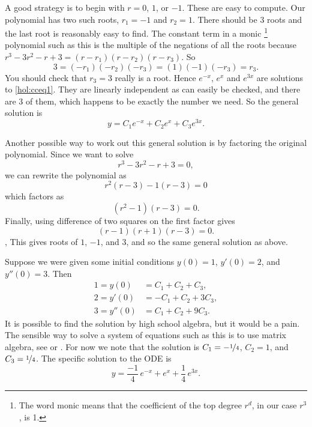\documentclass{ximera}
\begin{document}
\begin{exampleSol}
    A good strategy is to begin with $r=0$, $1$, or $-1$.  These are easy to compute. Our polynomial has two such roots, $r_1 = -1$ and $r_2 = 1$.  There should be 3 roots and the last root is reasonably easy to find.  The constant term in a monic%
    \footnote{The word monic means that the coefficient of the top degree $r^d$, in our case $r^3$, is 1.}
    polynomial such as this is the multiple of the negations of all the roots because $r^3 - 3 r^2 - r + 3 = (r-r_1)(r-r_2)(r-r_3)$. So
    \begin{equation*}
        3 = (-r_1)(-r_2)(-r_3) = (1)(-1)(-r_3) = r_3 .
    \end{equation*}
    You should check that $r_3 = 3$ really is a root.  Hence $e^{-x}$, $e^{x}$ and $e^{3x}$ are solutions to \eqref{hol:cceq1}.  They are linearly independent as can easily be checked, and there are 3 of them, which happens to be exactly the number we need.  So the general solution is
    \begin{equation*}
        y = C_1 e^{-x} + C_2 e^{x} + C_3 e^{3x} .
    \end{equation*}
    
    Another possible way to work out this general solution is by factoring the original polynomial. Since we want to solve 
    \[ 
        r^3 - 3r^2 - r + 3 = 0,
    \] 
    we can rewrite the polynomial as
    \[ 
        r^2(r-3) -1(r-3) = 0 
    \] 
    which factors as
    \[ 
        (r^2 - 1)(r-3) = 0. 
    \] 
    Finally, using difference of two squares on the first factor gives
    \[ 
        (r-1)(r+1)(r-3) = 0 .
    \] ,
    This gives roots of $1$, $-1$, and $3$, and so the same general solution as above.
    
    Suppose we were given some initial conditions $y(0) = 1$, $y'(0) = 2$, and $y''(0) = 3$.  Then
    \begin{align*}
        1 = y(0) & = C_1 + C_2 + C_3 , \\
        2 = y'(0) & = -C_1 + C_2 + 3C_3 , \\
        3 = y''(0) & = C_1 + C_2 + 9C_3 .
    \end{align*}
    It is possible to find the solution by high school algebra, but it would be a pain. The sensible way to solve a system of equations such as this is to use matrix algebra, see  or . For now we note that the solution is $C_1 = -\nicefrac{1}{4}$, $C_2 = 1$, and $C_3 = \nicefrac{1}{4}$.  The specific solution to the ODE is
    \begin{equation*}
        y = \frac{-1}{4}\, e^{-x} + e^x + \frac{1}{4}\, e^{3x} .
    \end{equation*}
\end{exampleSol}
\end{document}
